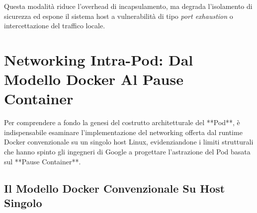 \documentclass[11pt, a4paper]{article}
\begin{document}
Questa modalità riduce l'overhead di incapsulamento, ma degrada l'isolamento di sicurezza ed espone il sistema host a vulnerabilità di tipo \emph{port exhaustion} o intercettazione del traffico locale.

\newpage


\section{Networking Intra-Pod: Dal Modello Docker Al Pause Container}

Per comprendere a fondo la genesi del costrutto architetturale del **Pod**, è indispensabile esaminare l'implementazione del networking offerta dal runtime Docker convenzionale su un singolo host Linux, evidenziandone i limiti strutturali che hanno spinto gli ingegneri di Google a progettare l'astrazione del Pod basata sul **Pause Container**.

\subsection{Il Modello Docker Convenzionale Su Host Singolo}
\end{document}

